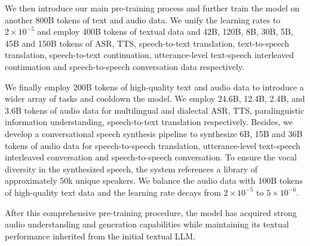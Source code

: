 We then introduce our main pre-training process and further train the model on another 800B tokens of text and audio data.
We unify the learning rates to $2\times10^{-5}$ 
and
employ
400B tokens of textual data and 
42B, 120B, 8B, 30B, 5B, 45B and 150B tokens of ASR, TTS, speech-to-text translation, text-to-speech translation, speech-to-text continuation, utterance-level text-speech interleaved continuation and speech-to-speech conversation data respectively.

We finally employ 200B tokens of high-quality text and audio data to introduce a wider array of tasks and cooldown the model.
We employ
24.6B,
12.4B,
2.4B,
and 3.6B
tokens of audio data 
for 
multilingual and dialectal ASR, 
TTS, 
paralinguistic information understanding, 
speech-to-text translation respectively.
Besides, 
we develop a conversational speech synthesis pipeline to synthesize 6B, 15B and 36B tokens of audio data for speech-to-speech translation, utterance-level text-speech interleaved conversation and speech-to-speech conversation.
To ensure the vocal diversity in the synthesized speech, the system references a library of approximately 50k unique speakers.
We balance the audio data with 100B tokens of high-quality text data and
the learning rate decays from $2\times10^{-5}$ to $5\times10^{-6}$.

After this comprehensive pre-training procedure, the model 
has acquired strong audio understanding and generation capabilities
while maintaining its textual performance inherited from the initial textual LLM.































